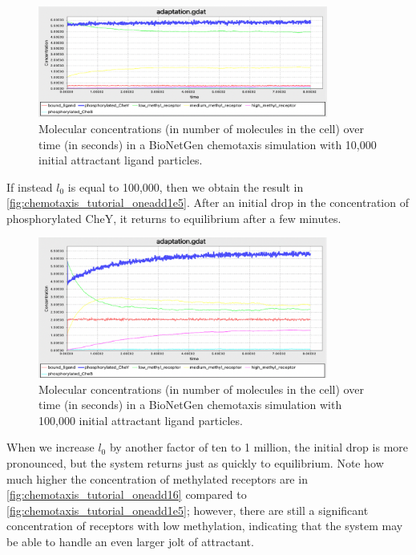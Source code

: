 \begin{figure}[h]
\centering
\mySfFamily
\includegraphics[width = 0.85\textwidth]{../images/chemotaxis_tutorial_oneadd1e4.png}
\caption{Molecular concentrations (in number of molecules in the cell) over time (in seconds) in a BioNetGen chemotaxis simulation with 10,000 initial attractant ligand particles.}
\label{fig:chemotaxis_tutorial_oneadd1e4}
\end{figure}


If instead $l_0$ is equal to 100,000, then we obtain the result in \autoref{fig:chemotaxis_tutorial_oneadd1e5}. After an initial drop in the concentration of phosphorylated CheY, it returns to equilibrium after a few minutes.

\begin{figure}[h]
\centering
\mySfFamily
\includegraphics[width = 0.85\textwidth]{../images/chemotaxis_tutorial_oneadd1e5.png}
\caption{Molecular concentrations (in number of molecules in the cell) over time (in seconds) in a BioNetGen chemotaxis simulation with 100,000 initial attractant ligand particles.}
\label{fig:chemotaxis_tutorial_oneadd1e5}
\end{figure}


When we increase $l_0$ by another factor of ten to 1 million, the initial drop is more pronounced, but the system returns just as quickly to equilibrium. Note how much higher the concentration of methylated receptors are in \autoref{fig:chemotaxis_tutorial_oneadd16} compared to \autoref{fig:chemotaxis_tutorial_oneadd1e5}; however, there are still a significant concentration of receptors with low methylation, indicating that the system may be able to handle an even larger jolt of attractant.\\

